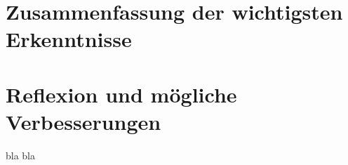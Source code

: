 
\section{Zusammenfassung der wichtigsten Erkenntnisse}
\section{Reflexion und mögliche Verbesserungen}
bla bla
\clearpage